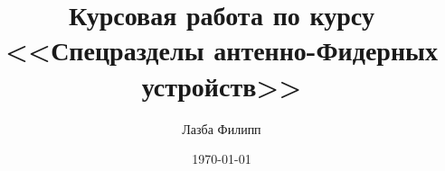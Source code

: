 \documentclass[a4paper,12pt]{report}
\author{Лазба Филипп}
\title{Курсовая работа  по курсу <<Спецразделы антенно-Фидерных устройств>>}
\date{\today}
\begin{document}
	
	\tableofcontents{}
	
	
	
	
\end{document}

